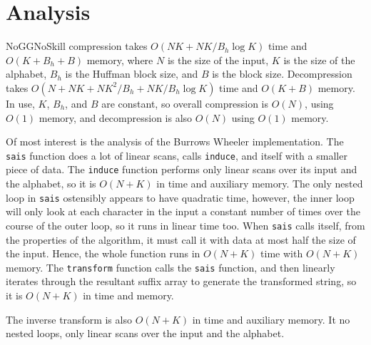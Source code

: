\documentclass[a4paper]{article}
\begin{document}
\section {Analysis}
\vspace*{-.4cm}
NoGGNoSkill compression takes $O(NK +NK/B_h\log{K})$ time and $O(K+B_h+B)$ memory, where $N$ is the size of the input, $K$ is the size of the alphabet, $B_h$ is the Huffman block size, and $B$ is the block size. Decompression takes $O(N + NK + NK^2/B _h+ NK/B_h\log{K})$ time and $O(K+B)$ memory. In use, $K$, $B_h$, and $B$ are constant, so overall compression is $O(N)$, using $O(1)$ memory, and decompression is also $O(N)$ using $O(1)$ memory.

Of most interest is the analysis of the Burrows Wheeler implementation. The \texttt{sais} function does a lot of linear scans, calls \texttt{induce}, and itself with a smaller piece of data. The \texttt{induce} function performs only linear scans over its input and the alphabet, so it is $O(N+K)$ in time and auxiliary memory. The only nested loop in \texttt{sais} ostensibly appears to have quadratic time, however, the inner loop will only look at each character in the input a constant number of times over the course of the outer loop, so it runs in linear time too. When \texttt{sais} calls itself, from the properties of the algorithm, it must call it with data at most half the size of the input. Hence, the whole function runs in $O(N+K)$ time with $O(N+K)$ memory. The \texttt{transform} function calls the \texttt{sais} function, and then linearly iterates through the resultant suffix array to generate the transformed string, so it is $O(N+K)$ in time and memory.

The inverse transform is also $O(N+K)$ in time and auxiliary memory. It no nested loops, only linear scans over the input and the alphabet. 
\end{document}
